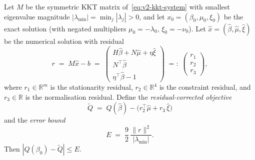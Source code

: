 \begin{lemma}%
\label{lem:v2-q-interval}
Let $M$ be the symmetric KKT matrix
of~\eqref{eq:v2-kkt-system}
with smallest eigenvalue magnitude
$|\lambda_{\min}| = \min_j |\lambda_j| > 0$,
and let $x_0 = (\beta_0, \mu_0, \xi_0)$ be the exact
solution (with negated multipliers
$\mu_0 = -\lambda_0$, $\xi_0 = -\nu_0$).
Let $\hat x = (\hat\beta, \hat\mu, \hat\xi)$ be the
numerical solution with residual
\[
  r \;=\; M\hat x - b
  \;=\; \begin{pmatrix}
    H\hat\beta + N\hat\mu + \eta\hat\xi \\
    N^\top\hat\beta \\
    \eta^\top\hat\beta - 1
  \end{pmatrix}
  \;=:\; \begin{pmatrix}r_1 \\ r_2 \\ r_3\end{pmatrix},
\]
where $r_1 \in \mathbb{R}^m$ is the stationarity residual,
$r_2 \in \mathbb{R}^4$ is the constraint residual, and
$r_3 \in \mathbb{R}$ is the normalisation residual.
Define the \emph{residual-corrected objective}
\begin{equation}\label{eq:v2-q-corrected}
  \tilde Q
  \;=\; Q(\hat\beta)
    - \bigl(r_2^\top\hat\mu + r_3\,\hat\xi\bigr)
\end{equation}
and the \emph{error bound}
\begin{equation}\label{eq:v2-q-error-bound}
  E \;=\; \frac{9}{2}\,\frac{\|r\|^2}{|\lambda_{\min}|}.
\end{equation}
Then $|Q(\beta_0) - \tilde Q| \leq E$.
\end{lemma}

